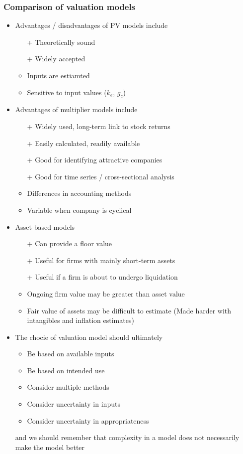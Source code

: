 \documentclass[../notes_compiled.tex]{subfiles}
\begin{document}
\subsubsection{Comparison of valuation models}
\begin{itemize}
\item Advantages / disadvantages of PV models include
\begin{itemize}
\item[+] Theoretically sound
\item[+] Widely accepted
\item Inputs are estiamted
\item Sensitive to input values ($k_{e}$, $g_{c}$)
\end{itemize}
\item Advantages of multiplier models include
\begin{itemize}
\item[+] Widely used, long-term link to stock returns
\item[+] Easily calculated, readily available
\item[+] Good for identifying attractive companies
\item[+] Good for time series / cross-sectional analysis
\item Differences in accounting methods
\item Variable when company is cyclical
\end{itemize}
\item Asset-based models
\begin{itemize}
\item[+] Can provide a floor value
\item[+] Useful for firms with mainly short-term assets
\item[+] Useful if a firm is about to undergo liquidation
\item Ongoing firm value may be greater than asset value
\item Fair value of assets may be difficult to estimate (Made harder with intangibles and inflation estimates)
\end{itemize}
\item The chocie of valuation model should ultimately
\begin{itemize}
\item Be based on available inputs
\item Be based on intended use
\item Consider multiple methods
\item Consider uncertainty in inputs
\item Consider uncertainty in appropriateness
\end{itemize}
and we should remember that complexity in a model does not necessarily make the model better
\end{itemize}
\end{document}
